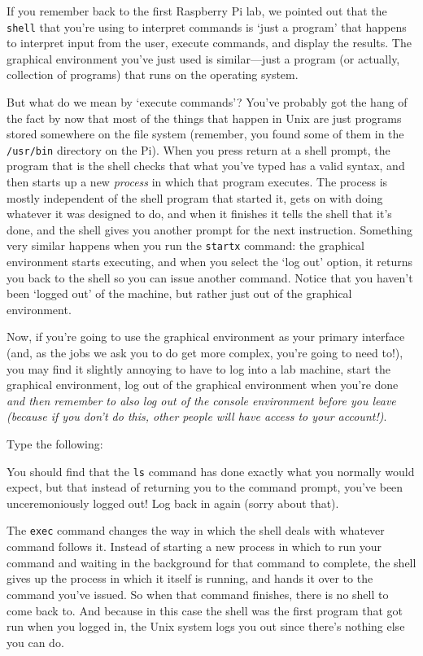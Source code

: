 If you remember back to the first Raspberry Pi lab, we pointed out that the \texttt{shell} that you're using to interpret commands is `just a program' that happens to interpret input from the user, execute commands, and display the results. The graphical environment you've just used is similar---just a program (or actually, collection of programs) that runs on the operating system.

But what do we mean by `execute commands'? You've probably got the hang of the fact by now that most of the things that happen in Unix are just programs stored somewhere on the file system (remember, you found some of them in the \texttt{/usr/bin} directory on the Pi). When you press return at a shell prompt, the program that is the shell checks that what you've typed has a valid syntax, and then starts up a new \textit{process} in which that program executes. The process is mostly independent of the shell program that started it, gets on with doing whatever it was designed to do, and when it finishes it tells the shell that it's done, and the shell gives you another prompt for the next instruction. Something very similar happens when you run the \texttt{startx} command: the graphical environment starts executing, and when you select the `log out' option, it returns you back to the shell so you can issue another command. Notice that you haven't been `logged out' of the machine, but rather just out of the graphical environment. 

Now, if you're going to use the graphical environment as your primary interface (and, as the jobs we ask you to do get more complex, you're going to need to!), you may find it slightly annoying to have to log into a lab machine, start the graphical environment, log out of the graphical environment when you're done \textit{and then remember to also log out of the console environment before you leave (because if you don't do this, other people will have access to your account!)}. 

Type the following:


You should find that the \texttt{ls} command has done exactly what you normally would expect, but that instead of returning you to the command prompt, you've been unceremoniously logged out! Log back in again (sorry about that). 

The \texttt{exec} command changes the way in which the shell deals with whatever command follows it. Instead of starting a new process in which to run your command and waiting in the background for that command to complete, the shell gives up the process in which it itself is running, and hands it over to the command you've issued. So when that command finishes, there is no shell to come back to. And because in this case the shell was the first program that got run when you logged in, the Unix system logs you out since there's nothing else you can do. 

